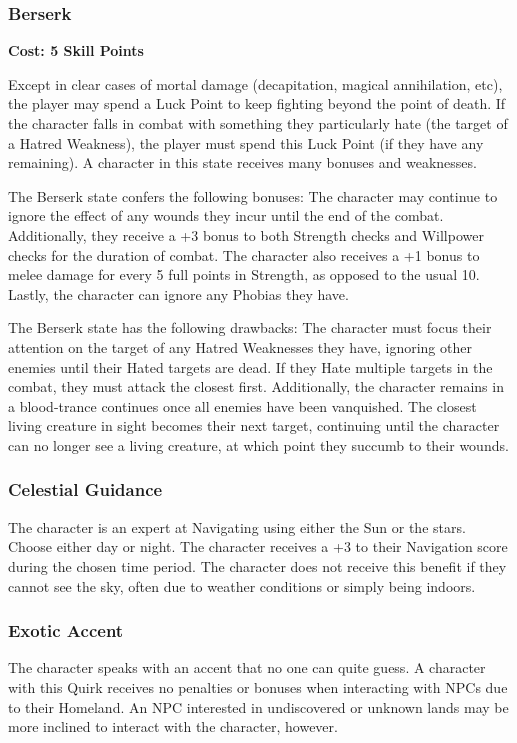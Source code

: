 \documentclass[oneside]{book}
\begin{document}
\newpage
\begin{multicols}{2}
\subsubsection{Berserk}
\textbf{Cost: 5 Skill Points}

Except in clear cases of mortal damage (decapitation, magical annihilation, etc), the player may spend a Luck Point to keep fighting beyond the point of death. If the character falls in combat with something they particularly hate (the target of a Hatred Weakness), the player must spend this Luck Point (if they have any remaining). A character in this state receives many bonuses and weaknesses.

The Berserk state confers the following bonuses: The character may continue to ignore the effect of any wounds they incur until the end of the combat. Additionally, they receive a +3 bonus to both Strength checks and Willpower checks for the duration of combat. The character also receives a +1 bonus to melee damage for every 5 full points in Strength, as opposed to the usual 10. Lastly, the character can ignore any Phobias they have.

The Berserk state has the following drawbacks: The character must focus their attention on the target of any Hatred Weaknesses they have, ignoring other enemies until their Hated targets are dead. If they Hate multiple targets in the combat, they must attack the closest first. Additionally, the character remains in a blood-trance continues once all enemies have been vanquished. The closest living creature in sight becomes their next target, continuing until the character can no longer see a living creature, at which point they succumb to their wounds. 

\subsubsection{Celestial Guidance}
The character is an expert at Navigating using either the Sun or the stars. Choose either day or night. The character receives a +3 to their Navigation score during the chosen time period. The character does not receive this benefit if they cannot see the sky, often due to weather conditions or simply being indoors.

\subsubsection{Exotic Accent}
The character speaks with an accent that no one can quite guess. A character with this Quirk receives no penalties or bonuses when interacting with NPCs due to their Homeland. An NPC interested in undiscovered or unknown lands may be more inclined to interact with the character, however. 


\end{multicols}
\end{document}
